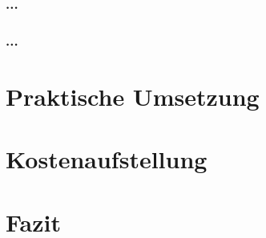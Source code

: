 \documentclass[12pt,a4paper]{scrreprt}
\begin{document}
\subsection{...}
\subsection{...}

\chapter{Praktische Umsetzung}

\chapter{Kostenaufstellung}

\chapter{Fazit}


 
\end{document}
